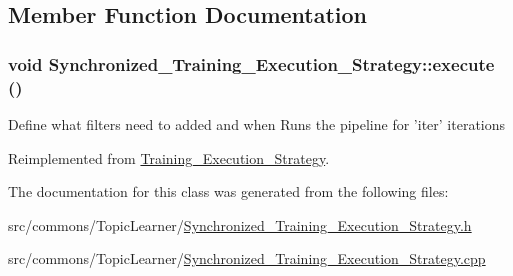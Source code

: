 \subsection{Member Function Documentation}
\hypertarget{class_synchronized___training___execution___strategy_a77e2fa3f19b544fa4392c9ed56c504e4}{
\subsubsection[{execute}]{\setlength{\rightskip}{0pt plus 5cm}void Synchronized\_\-Training\_\-Execution\_\-Strategy::execute ()}}
\label{class_synchronized___training___execution___strategy_a77e2fa3f19b544fa4392c9ed56c504e4}
Define what filters need to added and when Runs the pipeline for 'iter' iterations 

Reimplemented from \hyperlink{class_training___execution___strategy_adc14f066d7a325e87035fb8224097c47}{Training\_\-Execution\_\-Strategy}.



The documentation for this class was generated from the following files:\begin{DoxyCompactItemize}
\item 
src/commons/TopicLearner/\hyperlink{_synchronized___training___execution___strategy_8h}{Synchronized\_\-Training\_\-Execution\_\-Strategy.h}\item 
src/commons/TopicLearner/\hyperlink{_synchronized___training___execution___strategy_8cpp}{Synchronized\_\-Training\_\-Execution\_\-Strategy.cpp}\end{DoxyCompactItemize}
